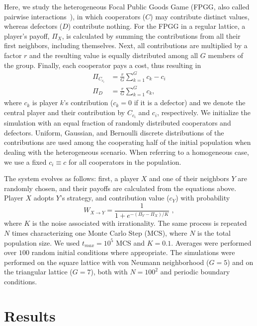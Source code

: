 \documentclass[twocolumn,aps,amsmath,pre,floatfix,superscriptaddress]{revtex4-2}
\begin{document}
Here, we study the heterogeneous Focal Public Goods Game (FPGG, also called pairwise interactions~\cite{perc2013evolutionary}), in which cooperators ($C$) may contribute distinct values,  whereas defectors ($D$) contribute nothing. For the FPGG in a regular lattice, a player's payoff, $\Pi_X$,  is calculated by summing the contributions from all their first neighbors, including themselves. 
%
Next, all contributions are multiplied by a factor $r$ and the resulting value  is equally distributed among all $G$ members of the group. Finally, each cooperator pays a cost,  thus resulting in 
%
\begin{align}
    \Pi_{C_{c_i}} &= \frac{r}{G} \sum_{k=1}^{G} c_k - c_i \label{eqC}\\
    \Pi_{D} &= \frac{r}{G} \sum_{k=1}^{G} c_k  \label{eqD},
\end{align}
where $c_k$ is player $k$'s contribution  ($c_k=0$ if it is a defector) and we denote the central player and their contribution by $C_{c_i}$ and $c_i$, respectively.
%
We initialize the simulation with an equal fraction of randomly distributed cooperators and defectors. Uniform,  Gaussian,  and Bernoulli discrete distributions of the contributions are used among the cooperating half of the initial population when dealing with the heterogeneous scenario. When referring to a homogeneous case,  we use a fixed $c_i \equiv c$ for all cooperators in the population.
%


The system evolves as follows: first, a player $X$ and one of their neighbors $Y$ are randomly chosen, and their payoffs are calculated from the equations above. Player $X$ adopts $Y$'s strategy, and contribution value ($c_Y$) with probability 
%
\begin{equation} \label{eq.transition}
     W_{X\rightarrow Y}= \frac{1}{1+e^{-(\Pi_Y-\Pi_X)/K}} \,\,,   
\end{equation}
%
where $K$ is the noise associated with irrationality. The same process is repeated $N$ times characterizing one Monte Carlo Step (MCS), where $N$ is the total population size. We used $t_{max} = 10^5$ MCS and $K=0.1$. Averages were performed over $100$ random initial conditions where appropriate.
%
The simulations were performed on the square lattice with von Neumann neighborhood ($G=5$) and on the triangular lattice ($G=7$), both with $N=100^2$ and periodic boundary conditions. 


\section{Results} 
\label{results}
\end{document}
